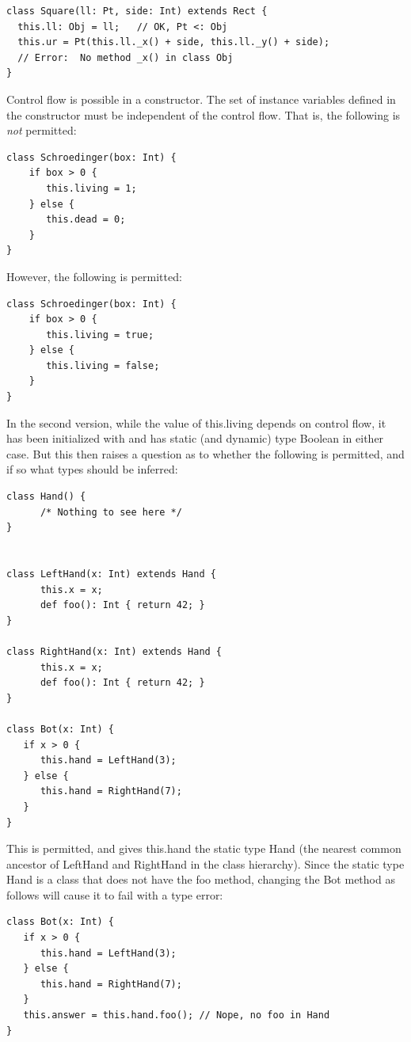 \documentclass[11pt]{article}
\begin{document}
\begin{verbatim}
class Square(ll: Pt, side: Int) extends Rect {
  this.ll: Obj = ll;   // OK, Pt <: Obj
  this.ur = Pt(this.ll._x() + side, this.ll._y() + side);
  // Error:  No method _x() in class Obj
}
\end{verbatim}


Control flow is possible in a constructor.   The set of instance
variables defined in the constructor must be independent of 
the control flow.  That is, the following is \emph{not} permitted: 

\begin{verbatim}
class Schroedinger(box: Int) {
    if box > 0 {
       this.living = 1; 
    } else {
       this.dead = 0;
    }
}
\end{verbatim}

\noindent However, the following is permitted: 

\begin{verbatim}
class Schroedinger(box: Int) {
    if box > 0 {
       this.living = true; 
    } else {
       this.living = false;
    }
}
\end{verbatim}

In the second version, while the value of this.living depends on
control flow, it has been initialized with and has static (and
dynamic) type Boolean in either case.   But this then raises a question
as to whether the following is permitted, and if so what types should
be inferred: 

\begin{verbatim}
class Hand() {
      /* Nothing to see here */
}


class LeftHand(x: Int) extends Hand {
      this.x = x;
      def foo(): Int { return 42; }
}

class RightHand(x: Int) extends Hand {
      this.x = x; 
      def foo(): Int { return 42; }
}

class Bot(x: Int) {
   if x > 0 {
      this.hand = LeftHand(3);
   } else {
      this.hand = RightHand(7);
   }
}
\end{verbatim}

This is permitted, and gives this.hand the static type Hand (the
nearest common ancestor of LeftHand and RightHand in the class
hierarchy).   Since the static type Hand is a class that does not 
have the foo method,  changing the Bot method as follows will 
cause it to fail with a type error: 
\begin{verbatim}
class Bot(x: Int) {
   if x > 0 {
      this.hand = LeftHand(3);
   } else {
      this.hand = RightHand(7);
   }
   this.answer = this.hand.foo(); // Nope, no foo in Hand
}
\end{verbatim}
\end{document}
